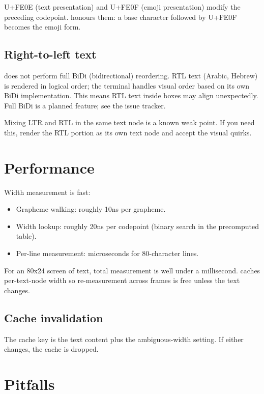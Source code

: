 U+FE0E (text presentation) and U+FE0F (emoji presentation) modify
the preceding codepoint. \maya{} honours them: a base character
followed by U+FE0F becomes the emoji form.

\subsection*{Right-to-left text}

\maya{} does not perform full BiDi (bidirectional) reordering.
RTL text (Arabic, Hebrew) is rendered in logical order; the
terminal handles visual order based on its own BiDi
implementation. This means RTL text inside boxes may align
unexpectedly. Full BiDi is a planned feature; see the issue
tracker.

\begin{warning}
Mixing LTR and RTL in the same text node is a known weak point.
If you need this, render the RTL portion as its own text node
and accept the visual quirks.
\end{warning}

\section{Performance}

Width measurement is fast:

\begin{itemize}[leftmargin=*]
  \item Grapheme walking: roughly 10ns per grapheme.
  \item Width lookup: roughly 20ns per codepoint (binary search
    in the precomputed table).
  \item Per-line measurement: microseconds for 80-character
    lines.
\end{itemize}

For an 80x24 screen of text, total measurement is well under a
millisecond. \maya{} caches per-text-node width so re-measurement
across frames is free unless the text changes.

\subsection*{Cache invalidation}

The cache key is the text content plus the ambiguous-width
setting. If either changes, the cache is dropped.

\section{Pitfalls}

